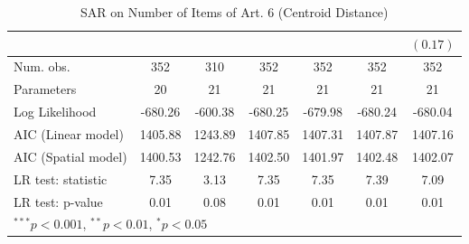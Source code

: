 \begin{table}[!h]
\begin{center}
\begin{tabular}{l c c c c c c }
                        &               &               &               &               &               & $(0.17)$      \\
\midrule
Num. obs.               & 352           & 310           & 352           & 352           & 352           & 352           \\
Parameters              & 20            & 21            & 21            & 21            & 21            & 21            \\
Log Likelihood          & -680.26       & -600.38       & -680.25       & -679.98       & -680.24       & -680.04       \\
AIC (Linear model)      & 1405.88       & 1243.89       & 1407.85       & 1407.31       & 1407.87       & 1407.16       \\
AIC (Spatial model)     & 1400.53       & 1242.76       & 1402.50       & 1401.97       & 1402.48       & 1402.07       \\
LR test: statistic      & 7.35          & 3.13          & 7.35          & 7.35          & 7.39          & 7.09          \\
LR test: p-value        & 0.01          & 0.08          & 0.01          & 0.01          & 0.01          & 0.01          \\
\bottomrule
\multicolumn{7}{l}{\scriptsize{$^{***}p<0.001$, $^{**}p<0.01$, $^*p<0.05$}}
\end{tabular}
\caption{SAR on Number of Items of Art. 6 (Centroid Distance)}
\label{table:coefficients}
\end{center}
\end{table}
